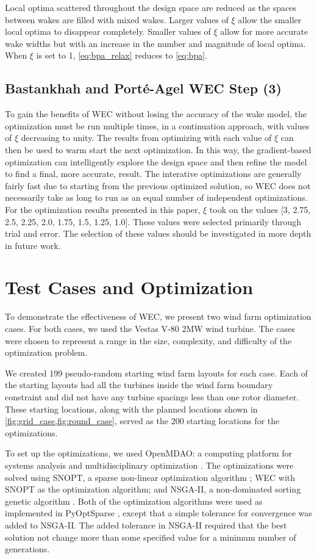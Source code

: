 \documentclass[a4paper]{jpconf}
\begin{document}
Local optima scattered throughout the design space are reduced as the spaces between wakes are filled with mixed wakes. Larger values of $\xi$ allow the smaller local optima to disappear completely. Smaller values of $\xi$ allow for more accurate wake widths but with an increase in the number and magnitude of local optima. When $\xi$ is set to 1, \cref{eq:bpa_relax} reduces to \cref{eq:bpa}.

\subsection{Bastankhah and Port\'e-Agel WEC Step (3)}
To gain the benefits of WEC without losing the accuracy of the wake model, the optimization must be run multiple times, in a continuation approach, with values of $\xi$ decreasing to unity. The results from optimizing with each value of $\xi$ can then be used to warm start the next optimization. In this way, the gradient-based optimization can intelligently explore the design space and then refine the model to find a final, more accurate, result. The interative optimizations are generally fairly fast due to starting from the previous optimized solution, so WEC does not necessarily take as long to run as an equal number of independent optimizations. For the optimization results presented in this paper, $\xi$ took on the values [3, 2.75, 2.5, 2.25, 2.0, 1.75, 1.5, 1.25, 1.0]. These values were selected primarily through trial and error. The selection of these values should be investigated in more depth in future work.

\section{Test Cases and Optimization}
To demonstrate the effectiveness of WEC, we present two wind farm optimization cases. For both cases, we used the Vestas V-80 2MW wind turbine. The cases were chosen to represent a range in the size, complexity, and difficulty of the optimization problem.

We created 199 pseudo-random starting wind farm layouts for each case. Each of the starting layouts had all the turbines inside the wind farm boundary constraint and did not have any turbine spacings less than one rotor diameter. These starting locations, along with the planned locations shown in \cref{fig:grid_case,fig:round_case}, served as the 200 starting locations for the optimizations.

To set up the optimizations, we used OpenMDAO: a computing platform for systems analysis and multidisciplinary optimization \cite{gray2010_OpenMDAO}. The optimizations were solved using SNOPT, a sparse non-linear optimization algorithm \cite{gill2005}; WEC with SNOPT as the optimization algorithm; 
and NSGA-II, a non-dominated sorting genetic algorithm \cite{deb2002_nsga2}. Both of the optimization algorithms were used as implemented in PyOptSparse \cite{ruben2012_pyopt}, except that a simple tolerance for convergence was added to NSGA-II. The added tolerance in NSGA-II required that the best solution not change more than some specified value for a minimum number of generations. 
\end{document}
